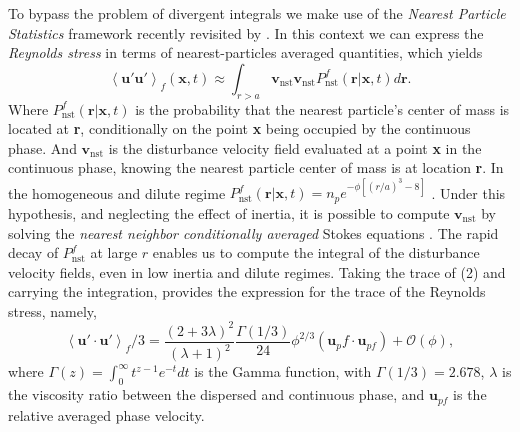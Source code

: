 \documentclass[12pt,a4paper]{article}
\newcommand{\avg}[1]{\left<#1\right>}
\renewcommand{\avg}[1]{\left<#1\right>}
\begin{document}
To bypass the problem of divergent integrals we make use of the  \textit{Nearest Particle Statistics} framework recently revisited by \cite{zhang2021ensemble}. 
In this context we can express the \textit{Reynolds stress} in terms of nearest-particles averaged quantities, which yields
\begin{equation}
    \avg{\textbf{u}'\textbf{u}'}_f(\textbf{x},t)
    \approx
    \int_{r >a}  \textbf{v}_\text{nst}  \textbf{v}_\text{nst} P_\text{nst}^f(\textbf{r}|\textbf{x},t) d\textbf{r}.
    \label{eq:eq2}
\end{equation}
Where $P_\text{nst}^f(\textbf{r}|\textbf{x},t)$ is the probability that the nearest particle's center of mass is located at \textbf{r}, conditionally on the point \textbf{x} being occupied by the continuous phase.
And $\textbf{v}_\text{nst}$ is the disturbance velocity field evaluated at a point \textbf{x} in the continuous phase, knowing the nearest particle center of mass is at location \textbf{r}. 
In the homogeneous and dilute regime $P_\text{nst}^f(\textbf{r}|\textbf{x},t) = n_p e^{- \phi [(r/a)^3 - 8]}$ \cite{zhang2021ensemble}.
Under this hypothesis, and neglecting the effect of inertia, it is possible to compute $\textbf{v}_\text{nst}$ by solving the \textit{nearest neighbor conditionally averaged} Stokes equations \cite{zhang2021ensemble}. 
The rapid decay of $P_\text{nst}^f$ at large $r$ enables us to compute the integral of the disturbance velocity fields, even in low inertia and dilute regimes. 
Taking the trace of (2) and carrying the integration, provides the expression for the trace of the Reynolds stress, namely,
\begin{equation}
    \avg{\textbf{u}'\cdot \textbf{u}'}_f/3
    = \frac{(2+3\lambda)^2}{(\lambda+1)^2}\frac{\Gamma(1/3)}{24} 
        \phi^{2/3}
        (\textbf{u}_pf\cdot \textbf{u}_{pf})
        + \mathcal{O}(\phi),
        \label{eq:results}
\end{equation}
where $\Gamma(z) = \int_0^\infty t^{z-1} e^{-t} dt$ is the Gamma function, with $\Gamma(1/3)= 2.678$, $\lambda$ is the viscosity ratio between the dispersed and continuous phase, and $\textbf{u}_{pf}$ is the relative averaged phase velocity. 
\end{document}
